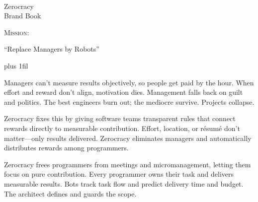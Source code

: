 \documentclass{article}
\newcommand\slide[1]{%
  \pagebreak\topskip0pt\vspace*{\fill}%
  \begin{center}\LARGE%
  #1
  \end{center}%
  \vspace*{\fill}}
\begin{document}
\color{zblack}

\sffamily


\newcommand\header[1]{{\scshape\LARGE #1:\\[1em]\par}}

\slide{%
  \\
  Zerocracy
  \\[1em]
  \large
  Brand Book
  \\
  \textcopyright{} \iexec{date +\%Y}}

\newcommand\intro{\rmfamily\normalsize\leftskip=0pt\rightskip=0pt\parfillskip=0pt plus 1fil\setlength{\parindent}{1.5em}}

\slide{
  \header{Mission}
  \par
  {\Huge \enquote{Replace Managers by Robots}\par}
  \vspace{1em}
  {\intro\begin{multicols}{3}
  Managers can't measure results objectively, so people get paid by the hour.
  When effort and reward don't align, motivation dies.
  Management falls back on guilt and politics.
  The best engineers burn out; the mediocre survive.
  Projects collapse.
  \par\columnbreak\par
  Zerocracy fixes this by giving software teams transparent rules that connect rewards directly to measurable contribution.
  Effort, location, or r\'{e}sum\'{e} don't matter---only results delivered.
  Zerocracy eliminates managers and automatically distributes rewards among programmers.
  \par\columnbreak\par
  Zerocracy frees programmers from meetings and micromanagement, letting them focus on pure contribution.
  Every programmer owns their task and delivers measurable results.
  Bots track task flow and predict delivery time and budget.
  The architect defines and guards the scope.
  \end{multicols}\par}}
\end{document}
